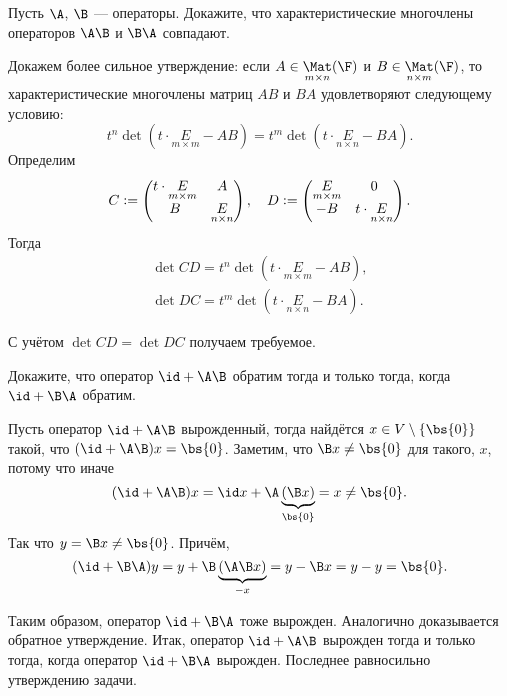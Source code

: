 \begin{problem}
    Пусть $\A$, $\B$ --- операторы. Докажите, что характеристические многочлены операторов $\A\B$ и $\B\A$ совпадают.
\end{problem}

\begin{solution}
    Докажем более сильное утверждение: если $A \in \underset{m \times n}{\Mat}(\F)$ и $B \in \underset{n \times m}{\Mat}(\F)$, то характеристические многочлены матриц $AB$ и $BA$ удовлетворяют следующему условию:
    \[
        t^n\det(t \cdot \underset{m \times m}{E} - AB) = t^m\det(t \cdot \underset{n \times n}{E} - BA).
    \]
    Определим 
    \[
        C \vcentcolon =
        \begin{pmatrix}
            t \cdot \underset{m \times m}{E} & A\\
            B & \underset{n \times n}{E}
        \end{pmatrix},\quad
        D \vcentcolon = 
        \begin{pmatrix}
            \underset{m \times m}{E} & 0\\
            -B & t \cdot \underset{n \times n}{E}
        \end{pmatrix}.
    \]
    Тогда
    \begin{gather*}
        \det CD = t^n\det(t \cdot \underset{m \times m}{E} - AB),\\
        \det DC = t^m\det(t \cdot \underset{n \times n}{E} - BA).
    \end{gather*}

    С учётом $\det CD = \det DC$ получаем требуемое.
\end{solution}

\begin{problem}
    Докажите, что оператор $\id + \A\B$ обратим тогда и только тогда, когда $\id + \B\A$ обратим.
\end{problem}

\begin{solution}
    Пусть оператор $\id + \A\B$ вырожденный, тогда найдётся $x \in V \setminus \{\bs{0}\}$ такой, что $(\id + \A\B)x = \bs{0}$. Заметим, что $\B x \ne \bs{0}$ для такого, $x$, потому что иначе
    \[
        (\id + \A\B)x = \id x + \A\underbrace{(\B x)}_{\bs{0}} = x \ne \bs{0}.
    \]
    Так что $y = \B x \ne \bs{0}$. Причём,
    \[
        (\id + \B\A)y = y + \B\underbrace{(\A\B x)}_{-x} = y - \B x = y - y = \bs{0}.
    \]

    Таким образом, оператор $\id + \B\A$ тоже вырожден. Аналогично доказывается обратное утверждение. Итак, оператор $\id + \A\B$ вырожден тогда и только тогда, когда оператор $\id + \B\A$ вырожден. Последнее равносильно утверждению задачи.
\end{solution}

